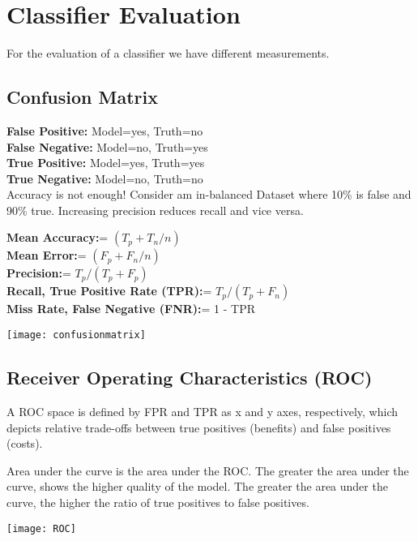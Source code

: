 \section{Classifier Evaluation}
For the evaluation of a classifier we have different measurements.

\subsection{Confusion Matrix}
\begin{minipage}{0,6\linewidth}
	\textbf{False Positive:} Model=yes, Truth=no \\
	\textbf{False Negative:} Model=no, Truth=yes \\
	\textbf{True Positive:} Model=yes, Truth=yes \\
	\textbf{True Negative:} Model=no, Truth=no  \\
	Accuracy is not enough! Consider am in-balanced Dataset where 10\% is false and 90\% true. Increasing precision reduces recall and vice versa.
	
	\centering
	\textbf{Mean Accuracy:}= $(T_{p} + T_{n} / n)$ \\
	\textbf{Mean Error:}= $(F_{p} + F_{n} / n)$ \\
	\textbf{Precision:}= $T_{p} / (T_{p} + F_{p})$ \\
	\textbf{Recall, True Positive Rate (TPR):}= $T_{p} / (T_{p} + F_{n})$ \\
	\textbf{Miss Rate, False Negative (FNR):}= 1 - TPR \\
	
\end{minipage}
\begin{minipage}{0,4\linewidth}
	\centering
	\texttt{[image: confusionmatrix]}  
\end{minipage}

\subsection{Receiver Operating Characteristics (ROC)}
\begin{minipage}{0,7\linewidth}
	A ROC space is defined by FPR and TPR as x and y axes, respectively, which depicts relative trade-offs between true positives (benefits) and false positives (costs).
	
	Area under the curve is the area under the ROC.  The greater the area under the curve, shows the higher quality of the model.  The greater the area under the curve, the higher the ratio of true positives to false positives.
\end{minipage}
\begin{minipage}{0,3\linewidth}
	\texttt{[image: ROC]}  
\end{minipage}



